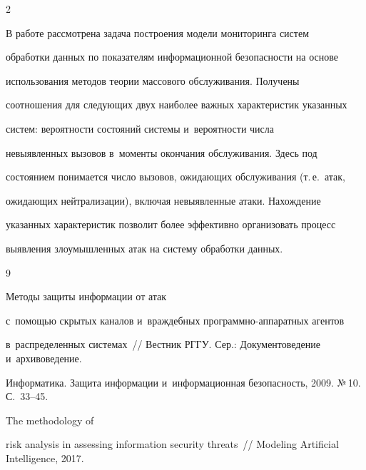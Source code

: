 \begin{multicols}{2}
  


  В работе рассмотрена задача построения модели мониторинга систем 


обработки данных по показателям информационной безопас\-ности на основе 


использования методов теории массового обслуживания. Получены 


соотношения для следующих двух наиболее важных характеристик указанных 


систем: вероятности состояний сис\-те\-мы и~вероятности чис\-ла 


невыявленных вызовов в~моменты окончания обслуживания. Здесь под 


состоянием понимается чис\-ло вызовов, ожидающих обслуживания (т.\,е.\ атак, 


ожидающих нейтрализации), включая невыявленные атаки. Нахождение 


указанных характеристик позволит более эффективно организовать процесс 


выявления злоумышленных атак на сис\-те\-му обработки данных. 


  


{\small\frenchspacing


 {%




 \begin{thebibliography}{9}


 




   Методы защиты информации от атак 


с~помощью скрытых каналов и~враждебных про\-граммно-ап\-па\-рат\-ных агентов 


в~распределенных системах~// Вестник РГГУ. Сер.: Документоведение и~архивоведение. 


Информатика. Защита информации и~информационная безопасность, 2009. №\,10. С.~33--45.







   The methodology of 


risk analysis in assessing information security threats~// Modeling Artificial Intelligence, 2017. 



\end{thebibliography}}}
\end{multicols}
